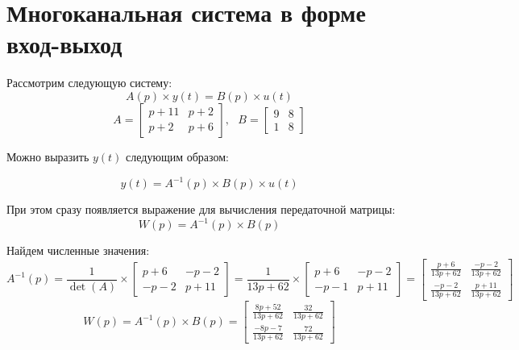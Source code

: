 \section{Многоканальная система в форме вход-выход}

Рассмотрим следующую систему: 
\begin{equation}
    A(p) \times y(t) = B(p) \times u(t)
\end{equation}
\begin{equation}
    A = \begin{bmatrix}
        p + 11 & p + 2 \\
        p + 2 & p + 6
    \end{bmatrix},~~~
    B = \begin{bmatrix}
        9 & 8 \\
        1 & 8
    \end{bmatrix}
\end{equation}

Можно выразить $y(t)$ следующим образом:

\begin{equation}
    y(t) = A^{-1}(p) \times B(p) \times u(t)
\end{equation}

При этом сразу появляется выражение для вычисления передаточной матрицы:
\begin{equation}
    W(p) = A^{-1}(p) \times B(p)
\end{equation}

Найдем численные значения: 
\begin{equation}
    A^{-1}(p) = \frac{1}{\det(A)} \times \begin{bmatrix}
        p + 6 & -p - 2 \\
        -p - 2 & p + 11
    \end{bmatrix} = 
    \frac{1}{13p + 62} \times \begin{bmatrix}
        p + 6 & -p - 2 \\
        -p - 1 & p + 11
    \end{bmatrix} = 
    \begin{bmatrix}
        \frac{p + 6}{13p + 62} & \frac{-p - 2}{13p + 62} \\
        \frac{-p - 2}{13p + 62} & \frac{p + 11}{13p + 62}
    \end{bmatrix}
\end{equation}
\begin{equation}
    W(p) = A^{-1}(p) \times B(p) = \begin{bmatrix}
        \frac{8p+52}{13p+62} & \frac{32}{13p+62} \\
        \frac{-8p-7}{13p+62} & \frac{72}{13p+62}
        \end{bmatrix}
\end{equation}

